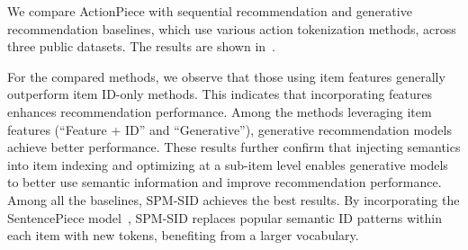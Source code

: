 We compare ActionPiece with sequential recommendation and generative recommendation baselines, which use various action tokenization methods, across three public datasets. The results are shown in~. 

For the compared methods, we observe that those using item features generally outperform item ID-only methods. This indicates that incorporating features enhances recommendation performance. Among the methods leveraging item features (``Feature + ID'' and ``Generative''), generative recommendation models achieve better performance. These results further confirm that injecting semantics into item indexing and optimizing at a sub-item level enables generative models to better use semantic information and improve recommendation performance. Among all the baselines, SPM-SID achieves the best results. By incorporating the SentencePiece model~\cite{kudo2018sentencepiece}, SPM-SID replaces popular semantic ID patterns within each item with new tokens, benefiting from a larger vocabulary.

